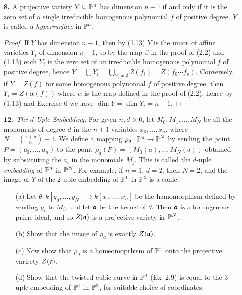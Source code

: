 \documentclass{article}
\begin{document}
\begin{enumerate} [label=\textbf{\arabic*.}, leftmargin=0cm]
\item[\textbf{8.}] A projective variety $Y \subseteq \mathbb{P}^n$ has dimension $n - 1$ if and only if it is the zero set of a single irreducible homogenous polynomial $f$ of positive degree. $Y$ is called a \textit{hypersurface} in $\mathbb{P}^n$.

\begin{proof}
    If $Y$ has dimension $n - 1$, then by (1.13) $Y$ is the union of affine varieties $Y_i$ of dimension $n - 1$, so by the map $\beta$ in the proof of (2.2) and (1.13) each $Y_i$ is the zero set of an irreducible homogenous polynomial $f$ of positive degree, hence $Y = \bigcup Y_i = \bigcup_{Y_i \neq \emptyset} Z(f_i) = Z(f_0 \cdots f_n)$. Conversely, if $Y = Z(f)$ for some homogenous polynomial $f$ of positive degree, then $Y_i = Z(\alpha(f))$ where $\alpha$ is the map defined in the proof of (2.2), hence by (1.13) and Exercise 6 we have $\dim{Y} = \dim{Y_i} = n - 1$.
\end{proof}

\item[\textbf{12.}] \textit{The $d$-Uple Embedding.}
For given $n, d > 0$, let $M_0, M_1, \dots, M_N$ be all the monomials of degree $d$ in the $n + 1$ variables $x_0, \dots, x_n$, where $N = {n + d \choose n} - 1$.
We define a mapping $\rho_d : \mathbb{P}^n \to \mathbb{P}^N$ by sending the point $P = (a_0, \dots, a_n)$ to the point $\rho_d(P) = (M_0(a), \dots, M_N(a))$ obtained by substituting the $a_i$ in the monomials $M_j$.
This is called the $d$-uple \textit{embedding} of $\mathbb{P}^n$ in $\mathbb{P}^N$.
For example, if $n = 1$, $d = 2$, then $N = 2$, and the image of $Y$ of the $2$-uple embedding of $\mathbb{P}^1$ in $\mathbb{P}^2$ is a conic.
\begin{itemize}
    \item[(a)] Let $\theta : k[y_0, \dots, y_N] \to k[x_0, \dots, x_n]$ be the homomorphism defined by sending $y_i$ to $M_i$, and let $\mathfrak{a}$ be the kernel of $\theta$. Then $\mathfrak{a}$ is a homogenous prime ideal, and so $Z(\mathfrak{a})$ is a projective variety in $\mathbb{P}^N$.
    \item[(b)] Show that the image of $\rho_d$ is exactly $Z(\mathfrak{a})$.
    \item[(c)] Now show that $\rho_d$ is a homeomoprhism of $\mathbb{P}^n$ onto the projective varieety $Z(\mathfrak{a})$.
    \item[(d)] Show that the twisted cubic curve in $\mathbb{P}^3$ (Ex. 2.9) is equal to the $3$-uple embedding of $\mathbb{P}^1$ in $\mathbb{P}^3$, for suitable choice of coordinates.
\end{itemize}


\end{enumerate}
\end{document}
